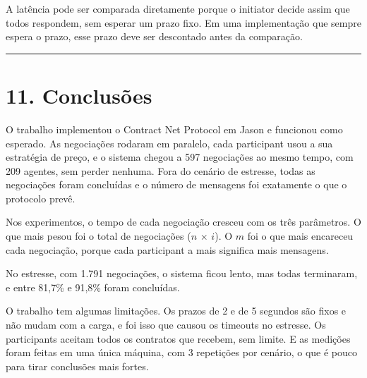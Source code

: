 \documentclass[11pt,a4paper]{article}
\newcommand{\separador}{\begin{center}\rule{0.45\linewidth}{0.4pt}\end{center}}
\begin{document}
A latência pode ser comparada diretamente porque o initiator decide assim que todos respondem, sem esperar um prazo fixo. Em uma implementação que sempre espera o prazo, esse prazo deve ser descontado antes da comparação.

\separador

\section*{11. Conclusões}

O trabalho implementou o Contract Net Protocol em Jason e funcionou como esperado. As negociações rodaram em paralelo, cada participant usou a sua estratégia de preço, e o sistema chegou a 597 negociações ao mesmo tempo, com 209 agentes, sem perder nenhuma. Fora do cenário de estresse, todas as negociações foram concluídas e o número de mensagens foi exatamente o que o protocolo prevê.

Nos experimentos, o tempo de cada negociação cresceu com os três parâmetros. O que mais pesou foi o total de negociações ($n$ $\times$ $i$). O $m$ foi o que mais encareceu cada negociação, porque cada participant a mais significa mais mensagens.

No estresse, com 1.791 negociações, o sistema ficou lento, mas todas terminaram, e entre 81,7\% e 91,8\% foram concluídas.

O trabalho tem algumas limitações. Os prazos de 2 e de 5 segundos são fixos e não mudam com a carga, e foi isso que causou os timeouts no estresse. Os participants aceitam todos os contratos que recebem, sem limite. E as medições foram feitas em uma única máquina, com 3 repetições por cenário, o que é pouco para tirar conclusões mais fortes.
\end{document}
